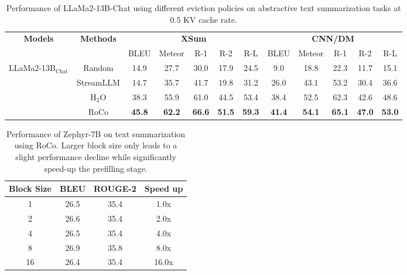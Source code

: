 \begin{table}[t!]
    \centering
    \small
    \begin{tabular}{cc|ccccc|ccccc}
    \toprule
    \multicolumn{1}{c}{\multirow{2}{*}{\textbf{Models}}} & \multirow{2}{*}{\textbf{Methods}} & \multicolumn{5}{c}{\textbf{XSum}}         & \multicolumn{5}{c}{\textbf{CNN/DM}}       \\
    \multicolumn{1}{c}{} &              & BLEU & Meteor & R-1  & R-2  & R-L  & BLEU & Meteor & R-1  & R-2  & R-L  \\
    \midrule
    \multirow{4}{*}{LLaMa2-13B$_{\text{Chat}}$} & Random &14.9  &27.7  &30.0  &17.9  &24.5  &9.0  &18.8  &22.3  &11.7  &15.1  \\
                         & StreamLLM   &14.7  &35.7    &41.7 &19.8  &31.2  &26.0  &43.1    &53.2  &30.4  &36.6  \\
                         & H$_{\text{2}}$O   &38.3  &55.9    &61.0  &44.5  &53.4  &38.4  &52.5    &62.3  &42.6  &48.6  \\
                         & RoCo         &\textbf{45.8}  &\textbf{62.2}    &\textbf{66.6}  &\textbf{51.5}  &\textbf{59.3}  &\textbf{41.4}  &\textbf{54.1}    &\textbf{65.1}  &\textbf{47.0}  &\textbf{53.0}  \\
    \bottomrule
    \end{tabular}
    \caption{Performance of LLaMa2-13B-Chat using different eviction policies on abstractive text summarization tasks at 0.5 KV cache rate.}
    \label{table:llama213b}
\end{table}
\begin{table}[h]
    \centering
    \small
    \begin{tabular}{cccc}
    \toprule
    \textbf{Block Size} & \textbf{BLEU} & \textbf{ROUGE-2} & \textbf{Speed up} \\
    \midrule
    1                   & 26.5          & 35.4            & 1.0x              \\
    2                   & 26.6          & 35.4             & 2.0x              \\
    4                   & 26.5          & 35.4             & 4.0x              \\
    8                   & 26.9          & 35.8             & 8.0x              \\
    16                  & 26.4          & 35.4             & 16.0x             \\
    \bottomrule
    \end{tabular}
    \caption{Performance of Zephyr-7B on text summarization using RoCo. Larger block size only leads to a slight performance decline while significantly speed-up the prefilling stage.}
    \label{table:block}
\end{table}

